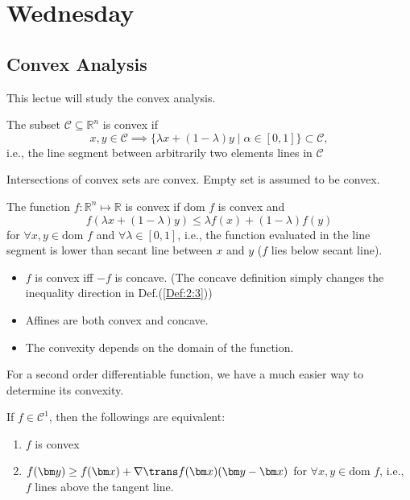 

\section{Wednesday}
\subsection{Convex Analysis}
This lectue will study the convex analysis.

\begin{definition}[Convex]
The subset $\mathcal{C}\subseteq\mathbb{R}^n$ is convex if
\[
x,y\in\mathcal{C}\implies
\{\lambda x + (1-\lambda)y\mid \alpha\in[0,1]\}\subset\mathcal{C},
\]
i.e., the line segment between arbitrarily two elements lines in $\mathcal{C}$
\end{definition}
\begin{remark}
Intersections of convex sets are convex. Empty set is assumed to be convex.
\end{remark}
\begin{definition}[Convex]\label{Def:2:3}
The function $f:\mathbb{R}^n\mapsto\mathbb{R}$ is convex if $\mbox{dom }f$ is convex and
\[
f(\lambda x+ (1-\lambda)y)\le\lambda f(x) + (1-\lambda) f(y)
\]
for $\forall x,y\in\mbox{dom }f$ and $\forall \lambda\in[0,1]$, i.e., the function evaluated in the line segment is lower than secant line between $x$ and $y$ ($f$ lies below secant line).
\end{definition}
\begin{remark}
\begin{itemize}
\item
$f$ is convex iff $-f$ is concave. (The concave definition simply changes the inequality direction in Def.(\ref{Def:2:3}))
\item
Affines are both convex and concave.
\item
The convexity depends on the domain of the function.
\end{itemize}
\end{remark}
For a second order differentiable function, we have a much easier way to determine its convexity.
\begin{theorem}\label{The:2:1}
If $f\in\mathcal{C}^1$, then the followings are equivalent:
\begin{enumerate}
\item
$f$ is convex
\item
$f(\bm y)\ge f(\bm x)+\nabla\trans f(\bm x)(\bm y - \bm x)$ for $\forall x,y\in\mbox{dom }f$, i.e., $f$ lines above the tangent line.
\end{enumerate}
\end{theorem}
